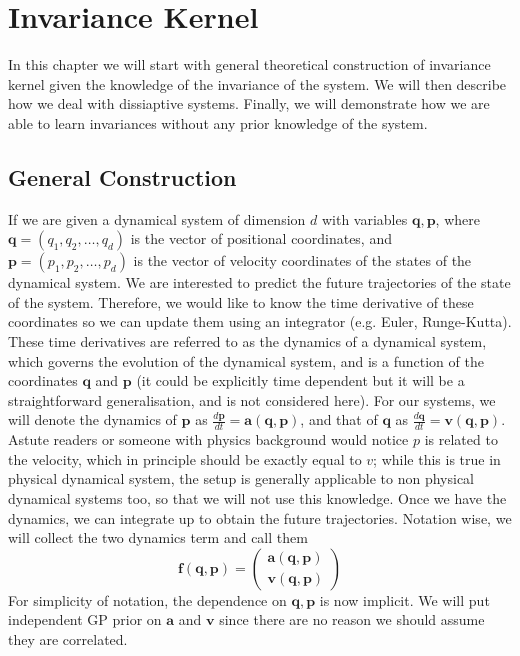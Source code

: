 \documentclass{statsmsc}
\begin{document}
\chapter{Invariance Kernel}
In this chapter we will start with general theoretical construction of invariance kernel given the knowledge of the invariance of the system.
We will then describe how we deal with dissiaptive systems.
Finally, we will demonstrate how we are able to learn invariances without any prior knowledge of the system.

\section{General Construction}
If we are given a dynamical system of dimension $d$ with variables $\mathbf{q}, \mathbf{p}$, where $\mathbf{q} = (q_1, q_2,\dots,q_d)$ is the vector of positional coordinates, and $\mathbf{p}=(p_1, p_2, \dots, p_d)$ is the vector of velocity coordinates of the states of the dynamical system.
We are interested to predict the future trajectories of the state of the system.
Therefore, we would like to know the time derivative of these coordinates so we can update them using an integrator (e.g. Euler, Runge-Kutta). 
These time derivatives are referred to as the dynamics of a dynamical system, which governs the evolution of the dynamical system, and is a function of the coordinates $\mathbf{q}$ and $\mathbf{p}$ (it could be explicitly time dependent but it will be a straightforward generalisation, and is not considered here). 
For our systems, we will denote the dynamics of $\mathbf{p}$ as $\frac{d\mathbf{p}}{dt}=\mathbf{a}(\mathbf{q}, \mathbf{p})$, and that of $\mathbf{q}$ as $\frac{d\mathbf{q}}{dt}=\mathbf{v}(\mathbf{q}, \mathbf{p})$.
Astute readers or someone with physics background would notice $p$ is related to the velocity, which in principle should be exactly equal to $v$; while this is true in physical dynamical system, the setup is generally applicable to non physical dynamical systems too, so that we will not use this knowledge. 
Once we have the dynamics, we can integrate up to obtain the future trajectories. 
Notation wise, we will collect the two dynamics term and call them $$\mathbf{f(\mathbf{q}, \mathbf{p})}=\begin{pmatrix}
    \mathbf{a(\mathbf{q}, \mathbf{p})}\\\mathbf{v(\mathbf{q}, \mathbf{p})}
\end{pmatrix}$$
For simplicity of notation, the dependence on $\mathbf{q}, \mathbf{p}$ is now implicit. 
We will put independent GP prior on $\mathbf{a}$ and $\mathbf{v}$ since there are no reason we should assume they are correlated. 
\end{document}
